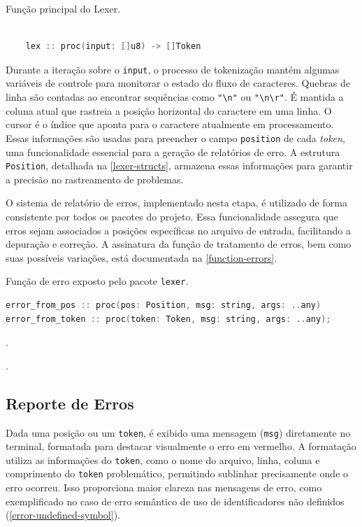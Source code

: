 \begin{codigo}[htb]
        \caption{\small Função principal do Lexer. }
        \label{function-lex}
  \begin{lstlisting}[language = c]
  
    lex :: proc(input: []u8) -> []Token
  \end{lstlisting}
\end{codigo}



Durante a iteração sobre o \texttt{input}, o processo de tokenização mantém algumas variáveis de controle para monitorar o estado do fluxo de caracteres. Quebras de linha são contadas ao encontrar sequências como \verb|"\n"| ou \verb|"\n\r"|. É mantida a coluna atual que rastreia a posição horizontal do caractere em uma linha. O cursor é o índice que aponta para o caractere atualmente em processamento. Essas informações são usadas para preencher o campo \texttt{position} de cada \textit{token}, uma funcionalidade essencial para a geração de relatórios de erro. A estrutura \texttt{Position}, detalhada na \autoref{lexer-structs}, armazena essas informações para garantir a precisão no rastreamento de problemas.

O sistema de relatório de erros, implementado nesta etapa, é utilizado de forma consistente por todos os pacotes do projeto. Essa funcionalidade assegura que erros sejam associados a posições específicas no arquivo de entrada, facilitando a depuração e correção. A assinatura da função de tratamento de erros, bem como suas possíveis variações, está documentada na \autoref{function-errors}.


\begin{codigo}[htb]
    \caption{\small Função de erro exposto pelo pacote \texttt{lexer}. }
        \label{function-errors}
\begin{lstlisting}[language=C++]
error_from_pos :: proc(pos: Position, msg: string, args: ..any)
error_from_token :: proc(token: Token, msg: string, args: ..any);
\end{lstlisting}.
\end{codigo}.


\subsection{Reporte de Erros} \label{subsection-erros}


Dada uma posição ou um \texttt{token}, é exibido uma mensagem (\texttt{msg}) diretamente no terminal, formatada para destacar visualmente o erro em vermelho. A formatação utiliza as informações do \texttt{token}, como o nome do arquivo, linha, coluna e comprimento do \texttt{token} problemático, permitindo sublinhar precisamente onde o erro ocorreu. Isso proporciona maior clareza nas mensagens de erro, como exemplificado no caso de erro semântico de uso de identificadores não definidos (\autoref{error-undefined-symbol}).

